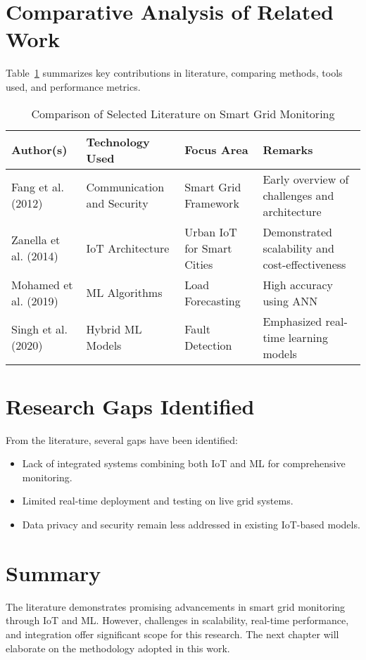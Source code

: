 \section{Comparative Analysis of Related Work}
Table~\ref{tab:relatedwork} summarizes key contributions in literature, comparing methods, tools used, and performance metrics.

\begin{table}[H]
\centering
\caption{Comparison of Selected Literature on Smart Grid Monitoring}
\label{tab:relatedwork}
\begin{tabular}{|p{3.5cm}|p{3cm}|p{3cm}|p{3cm}|}
\hline
\textbf{Author(s)} & \textbf{Technology Used} & \textbf{Focus Area} & \textbf{Remarks} \\
\hline
Fang et al. (2012) \cite{fang2012smart} & Communication and Security & Smart Grid Framework & Early overview of challenges and architecture \\
\hline
Zanella et al. (2014) \cite{zanella2014internet} & IoT Architecture & Urban IoT for Smart Cities & Demonstrated scalability and cost-effectiveness \\
\hline
Mohamed et al. (2019) \cite{mohamed2019machine} & ML Algorithms & Load Forecasting & High accuracy using ANN \\
\hline
Singh et al. (2020) \cite{singh2020review} & Hybrid ML Models & Fault Detection & Emphasized real-time learning models \\
\hline
\end{tabular}
\end{table}

\section{Research Gaps Identified}
From the literature, several gaps have been identified:
\begin{itemize}
    \item Lack of integrated systems combining both IoT and ML for comprehensive monitoring.
    \item Limited real-time deployment and testing on live grid systems.
    \item Data privacy and security remain less addressed in existing IoT-based models.
\end{itemize}

\section{Summary}
The literature demonstrates promising advancements in smart grid monitoring through IoT and ML. However, challenges in scalability, real-time performance, and integration offer significant scope for this research. The next chapter will elaborate on the methodology adopted in this work.

